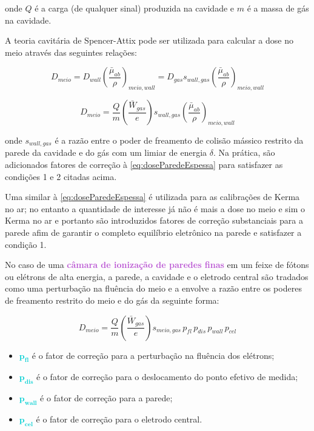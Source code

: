 \documentclass[11pt,a4paper]{article}
\newcounter{exemplo}
\begin{document}
			\noindent onde $Q$ é a carga (de qualquer sinal) produzida na cavidade e $m$ é a massa de gás na cavidade.

			A teoria cavitária de Spencer-Attix pode ser utilizada para calcular a dose no meio através das seguintes relações:

			$$D_{meio} = D_{wall} \left(\frac{\bar{\mu}_{ab}}{\rho}\right)_{meio, wall} = D_{gas} s_{wall, gas}\left(\frac{\bar{\mu}_{ab}}{\rho}\right)_{meio, wall}$$

			\begin{equation}
				D_{meio} = \frac{Q}{m}\left(\frac{\bar{W}_{gas}}{e}\right)s_{wall, gas}\left(\frac{\bar{\mu}_{ab}}{\rho}\right)_{meio, wall}
				\label{eq:doseParedeEspessa}
			\end{equation}

			\noindent onde $s_{wall, gas}$ é a razão entre o poder de freamento de colisão mássico restrito da parede da cavidade e do gás com um limiar de energia $\delta$. Na prática, são adicionados fatores de correção à   \ref{eq:doseParedeEspessa} para satisfazer as condições 1 e 2 citadas acima.

			Uma   similar à   \ref{eq:doseParedeEspessa} é utilizada para as calibrações de Kerma no ar; no entanto a quantidade de interesse já não é mais a dose no meio e sim o Kerma no ar e portanto são introduzidos fatores de correção substanciais para a parede afim de garantir o completo equilíbrio eletrônico na parede e satisfazer a condição 1.

			No caso de uma \textbf{\textcolor{MediumOrchid}{câmara de ionização de paredes finas}} em um feixe de fótons ou elétrons de alta energia, a parede, a cavidade e o eletrodo central são tradados como uma perturbação na fluência do meio e a   envolve a razão entre os poderes de freamento restrito do meio e do gás da seguinte forma:

				\begin{equation}
					D_{meio} = \frac{Q}{m}\left(\frac{\bar{W}_{gas}}{e}\right)s_{meio, gas}\, p_{fl}\, p_{dis}\, p_{wall}\, p_{cel}
				\end{equation}

			\begin{exemplo}[onde,]
				\begin{itemize}
					\item \textcolor{DarkTurquoise}{$\mathbf{p_{fl}}$} é o fator de correção para a perturbação na fluência dos elétrons;
					\item \textcolor{DarkTurquoise}{$\mathbf{p_{dis}}$} é o fator de correção para o deslocamento do ponto efetivo de medida;
					\item \textcolor{DarkTurquoise}{$\mathbf{p_{wall}}$} é o fator de correção para a parede;
					\item \textcolor{DarkTurquoise}{$\mathbf{p_{cel}}$} é o fator de correção para o eletrodo central.
				\end{itemize}
			\end{exemplo}

  
\end{document}
